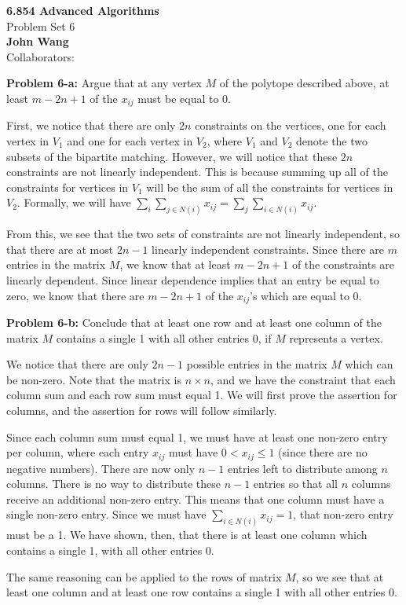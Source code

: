 \documentclass[psamsfonts]{amsart}
\newenvironment{sol}{\vspace{0.25cm}{\large \bfseries Solution:}}{\qedsymbol}
\newenvironment{prob}[1]{\begin{framed}{\large \bfseries Problem #1:}}{\end{framed}}
\newcommand{\makenewtitle}{
    \begin{center}
    {\huge \bfseries 6.854 Advanced Algorithms} \\
    Problem Set 6\\
    \vspace{0.25cm}
    {\bfseries John Wang} \\
    Collaborators: 
    \end{center}
    \vspace{0.5cm}
}
\begin{document}
\newpage
\makenewtitle

\begin{prob}{6-a}
Argue that at any vertex $M$ of the polytope described above, at least $m - 2n + 1$ of the $x_{ij}$ must be equal to 0. 
\end{prob}
\begin{sol}
First, we notice that there are only $2n$ constraints on the vertices, one for each vertex in $V_1$ and one for each vertex in $V_2$, where $V_1$ and $V_2$ denote the two subsets of the bipartite matching. However, we will notice that these $2n$ constraints are not linearly independent. This is because summing up all of the constraints for vertices in $V_1$ will be the sum of all the constraints for vertices in $V_2$. Formally, we will have $\sum_{i} \sum_{j \in N(i)} x_{ij} = \sum_{j} \sum_{i \in N(i)} x_{ij}$.

From this, we see that the two sets of constraints are not linearly independent, so that there are at most $2n-1$ linearly independent constraints. Since there are $m$ entries in the matrix $M$, we know that at least $m - 2n + 1$ of the constraints are linearly dependent. Since linear dependence implies that an entry be equal to zero, we know that there are $m - 2n + 1$ of the $x_{ij}$'s which are equal to 0.
\end{sol}

\begin{prob}{6-b}
Conclude that at least one row and at least one column of the matrix $M$ contains a single 1 with all other entries 0, if $M$ represents a vertex.
\end{prob}
\begin{sol}
We notice that there are only $2n-1$ possible entries in the matrix $M$ which can be non-zero. Note that the matrix is $n\times n$, and we have the constraint that each column sum and each row sum must equal 1. We will first prove the assertion for columns, and the assertion for rows will follow similarly.

Since each column sum must equal 1, we must have at least one non-zero entry per column, where each entry $x_{ij}$ must have $0 < x_{ij} \leq 1$ (since there are no negative numbers). There are now only $n-1$ entries left to distribute among $n$ columns. There is no way to distribute these $n-1$ entries so that all $n$ columns receive an additional non-zero entry. This means that one column must have a single non-zero entry. Since we must have $\sum_{i \in N(i)} x_{ij} = 1$, that non-zero entry must be a 1. We have shown, then, that there is at least one column which contains a single 1, with all other entries 0. 

The same reasoning can be applied to the rows of matrix $M$, so we see that at least one column and at least one row contains a single 1 with all other entries 0.
\end{sol}
\end{document}
